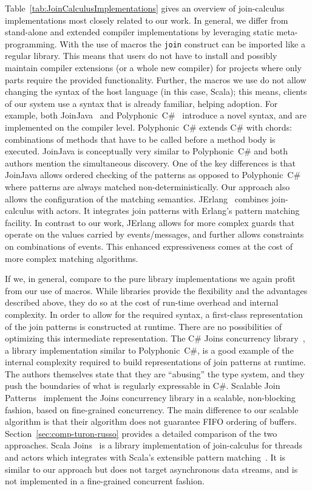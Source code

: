 \documentclass[runningheads]{llncs}
\begin{document}
\begin{sloppypar}
Table~\ref{tab:JoinCalculusImplementations} gives an overview of join-calculus
implementations most closely related to our work.
In general, we differ from stand-alone and extended compiler implementations
by leveraging static meta-programming. With the use of macros the \verb|join| construct
can be imported like a regular library. This means that users do not have to
install and possibly maintain compiler extensions (or a whole new compiler)
for projects where only parts require the provided functionality. Further, the
macros we use do not allow changing the syntax of the host language (in this case, Scala);
this means, clients of our system use a syntax that is already familiar, helping adoption.
For example, both
JoinJava~\cite{Itzstein:2001} and Polyphonic~C\#~\cite{Benton:2004} introduce
a novel syntax, and are implemented on the compiler level. Polyphonic~C\#
extends C\# with chords: combinations of methods that have to be called before
a method body is executed. JoinJava is conceptually very similar to
Polyphonic~C\# and both authors mention the simultaneous discovery. One of the key
differences is that JoinJava allows ordered checking of the patterns as
opposed to Polyphonic~C\# where patterns are always matched non-deterministically.
Our approach also allows the configuration of the matching
semantics. JErlang~\cite{Plociniczak:2010} combines join-calculus with actors.
It integrates join patterns with Erlang's pattern matching facility. In contrast to our
work, JErlang allows for more complex guards that operate on the values
carried by events/messages, and further allows constraints on combinations of
events. This enhanced expressiveness comes at the cost of more complex matching
algorithms.

If we, in general, compare to the pure library implementations we again profit
from our use of macros. While libraries provide the flexibility and
the advantages described above, they do so at the cost of run-time overhead and
internal complexity. In order to allow for the required syntax, a first-class
representation of the join patterns is constructed at runtime. There are no
possibilities of optimizing this intermediate representation. The C\# Joins
concurrency library~\cite{Russo:2007}, a library implementation similar to
Polyphonic~C\#, is a good example of the internal complexity required to build
representations of join patterns at runtime. The authors themselves state that they are
``abusing'' the type system, and they push the boundaries of what is regularly
expressable in C\#. Scalable Join Patterns~\cite{Turon:2011} implement the Joins concurrency
library in a scalable, non-blocking fashion, based on fine-grained concurrency. The main
difference to our scalable algorithm is that their algorithm does not
guarantee FIFO ordering of buffers. Section~\ref{sec:comp-turon-russo} provides a detailed comparison
of the two approaches. Scala Joins~\cite{Haller:2008} is a library
implementation of join-calculus for threads and actors which integrates with Scala's
extensible pattern matching~\cite{EmirOW07}. It is similar to our approach but does not target
asynchronous data streams, and is not implemented in a fine-grained concurrent fashion.


\end{sloppypar}
\end{document}
